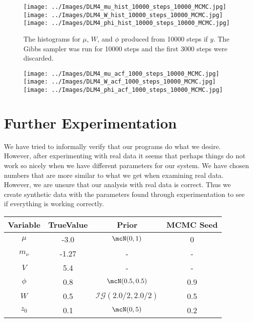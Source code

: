 \documentclass{article}
\begin{document}
\begin{figure}[!h]
\begin{center}
\texttt{[image: ../Images/DLM4\_mu\_hist\_10000\_steps\_10000\_MCMC.jpg]}
\texttt{[image: ../Images/DLM4\_W\_hist\_10000\_steps\_10000\_MCMC.jpg]}
\texttt{[image: ../Images/DLM4\_phi\_hist\_10000\_steps\_10000\_MCMC.jpg]}
\end{center}
\label{DLM4:histograms}
\caption{The histograms for $\mu$, $W$, and $\phi$ produced from 10000 steps if $y$.  The Gibbs sampler was run for 10000 steps and the first 3000 steps were discarded.}
\end{figure}

\begin{figure}[!h]
\begin{center}
\texttt{[image: ../Images/DLM4\_mu\_acf\_1000\_steps\_10000\_MCMC.jpg]}
\texttt{[image: ../Images/DLM4\_W\_acf\_1000\_steps\_10000\_MCMC.jpg]}
\texttt{[image: ../Images/DLM4\_phi\_acf\_1000\_steps\_10000\_MCMC.jpg]}
\end{center}
\end{figure}

\section{Further Experimentation}

We have tried to informally verify that our programs do what we desire.  However, after experimenting with real data it seems that perhaps things do not work so nicely when we have different parameters for our system.  We have chosen numbers that are more similar to what we get when examining real data.  However, we are unsure that our analysis with real data is correct.  Thus we create synthetic data with the parameters found through experimentation to see if everything is working correctly.

\begin{center}
\begin{tabular}{c | c | c | c}
Variable & TrueValue & Prior & MCMC Seed\\
\hline
$\mu$ & -3.0 & $\mcN(0, 1)$ & 0 \\
\hline
$m_\nu$ & -1.27 & - & - \\
\hline
$V$ & 5.4 & - & - \\
\hline
$\phi$ & 0.8 & $\mcN(0.5, 0.5)$ & 0.9 \\
\hline
$W$ & 0.5 & $\mathcal{IG}(2.0/2, 2.0/2)$ & 0.5 \\
\hline
$z_0$ & 0.1 & $\mcN(0,5)$ & 0.2
\end{tabular}
\end{center}
\end{document}
